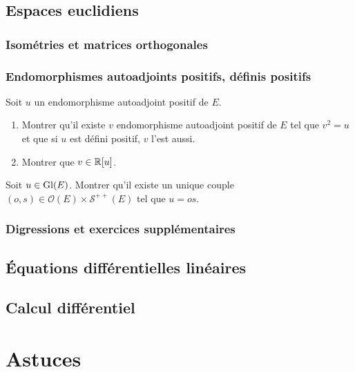 \documentclass[12pt,a4paper]{exo_book}
\begin{document}
\chapter{Espaces euclidiens}

\section{Isométries et matrices orthogonales}

\section{Endomorphismes autoadjoints positifs, définis positifs}

\begin{exo}
    Soit $u$ un endomorphisme autoadjoint positif de $E$.
    \begin{enumerate}
        \item Montrer qu'il existe $v$ endomorphisme autoadjoint positif de $E$ tel que $v^2 = u$ et que si $u$ est défini positif, $v$ l'est aussi.
        \item Montrer que $v \in \mathbb{R} [u]$.
    \end{enumerate}
\end{exo}

\begin{exo}
    Soit $u \in \operatorname{Gl} (E)$. Montrer qu'il existe un unique couple $(o, s) \in \mathcal{O}(E) \times \mathcal{S}^{++} (E)$ tel que $u=os$.
\end{exo}

\section{Digressions et exercices supplémentaires}

\chapter{Équations différentielles linéaires}

\chapter{Calcul différentiel}




\part{Astuces}
\end{document}
